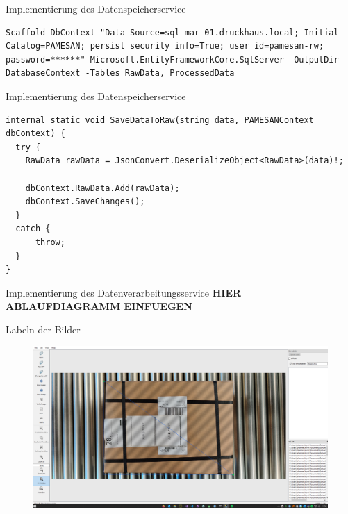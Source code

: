 \documentclass[10pt,ngerman]{beamer}
\begin{document}
\begin{frame}[fragile]{Implementierung des Datenspeicherservice}

  \pause

  \begin{lstlisting}[style=bash-style,
    breaklines=true]
    Scaffold-DbContext "Data Source=sql-mar-01.druckhaus.local; Initial Catalog=PAMESAN; persist security info=True; user id=pamesan-rw; password=******" Microsoft.EntityFrameworkCore.SqlServer -OutputDir DatabaseContext -Tables RawData, ProcessedData
\end{lstlisting}
\end{frame}


\begin{frame}[fragile]{Implementierung des Datenspeicherservice}
  \begin{lstlisting}[style=cSharpStyle,
    breaklines=true, firstnumber=38]
internal static void SaveDataToRaw(string data, PAMESANContext dbContext) {
  try {
    RawData rawData = JsonConvert.DeserializeObject<RawData>(data)!;

    dbContext.RawData.Add(rawData);
    dbContext.SaveChanges();
  }
  catch {
      throw;
  }
}
\end{lstlisting}
\end{frame}


\begin{frame}[fragile]{Implementierung des Datenverarbeitungsservice}
  \textbf{HIER ABLAUFDIAGRAMM EINFUEGEN}
\end{frame}


\begin{frame}[fragile]{Labeln der Bilder}
  \begin{figure}[htpb]
    \centering
    \includegraphics[width=1\textwidth]{pics/labelImg.png}
  \end{figure}
\end{frame}
\end{document}
